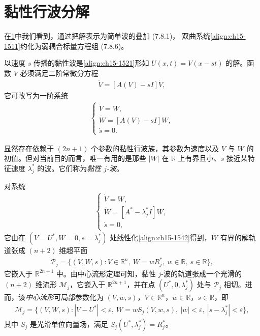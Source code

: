 \documentclass[../../main.tex]{subfiles}
\begin{document}
\section{黏性行波分解}\label{section:ch15-黏性行波分解}

在\cref{section:ch15-黏性行波分解}中我们看到，通过把解表示为简单波的叠加 (7.8.1)，
双曲系统\eqref{align:ch15-1511}约化为弱耦合标量方程组 (7.8.6)。

以速度 $s$ 传播的黏性波是\eqref{align:ch15-1521}形如 $U(x,t)=V(x-st)$ 的解。函数 $V$ 必须满足二阶常微分方程
\begin{align}
\ddot V=[A(V)-sI]\dot V,
\label{align:ch15-1541}
\end{align}
它可改写为一阶系统
\begin{align}
\begin{cases}
\dot V=W,\\
\dot W=[A(V)-sI]W,\\
\dot s=0.
\end{cases}
\label{align:ch15-1542}
\end{align}

显然存在依赖于 $(2n+1)$ 个参数的黏性行波族，其参数为速度以及 $V$ 与 $W$ 的初值。但对当前目的而言，唯一有用的是那些 $|W|$ 在 $\mathbb{R}$ 上有界且小、$s$ 接近某特征速度 $\lambda_j^*$ 的波。它们称为\emph{黏性 $j$-波}。

对系统
\begin{align}
\begin{cases}
\dot V=W,\\
\dot W=[A^*-\lambda_j^*I]W,\\
\dot s=0,
\end{cases}
\label{align:ch15-1543}
\end{align}
它由在 $(V=U^*,W=0,s=\lambda_j^*)$ 处线性化\eqref{align:ch15-1542}得到，$W$ 有界的解轨道张成 $(n+2)$ 维超平面
\begin{align}
\mathscr{P}_j=\{(V,W,s):V\in\mathbb{R}^n,\ W=wR_j^*,\ w\in\mathbb{R},\ s\in\mathbb{R}\},
\label{align:ch15-1544}
\end{align}
它嵌入于 $\mathbb{R}^{2n+1}$ 中。由中心流形定理可知，黏性 $j$-波的轨道张成一个光滑的 $(n+2)$ 维流形 $\mathscr{M}_j$，它嵌入于 $\mathbb{R}^{2n+1}$，并在点 $(U^*,0,\lambda_j^*)$ 处与 $\mathscr{P}_j$ 相切。进而，该\emph{中心流形}可局部参数化为 $(V,w,s)$，$V\in\mathbb{R}^n$，$w\in\mathbb{R}$，$s\in\mathbb{R}$，即
\begin{align}
\mathscr{M}_j=\{(V,W,s):|V-U^*|<\varepsilon,\ W=wS_j(V,w,s),\ |w|<\varepsilon,\ |s-\lambda_j^*|<\varepsilon\},
\label{align:ch15-1545}
\end{align}
其中 $S_j$ 是光滑单位向量场，满足 $S_j(U^*,\lambda_j^*)=R_j^*$。
\end{document}
